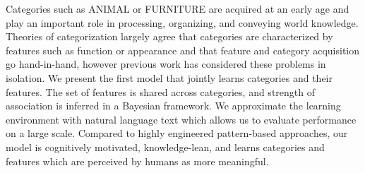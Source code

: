 Categories such as ANIMAL or FURNITURE are acquired at an early age and play an important role in processing, organizing, and conveying world knowledge. Theories of categorization largely agree that categories are characterized by features such as function or appearance and that feature and category acquisition go hand-in-hand, however previous work has considered these problems in isolation. We present the first model that jointly learns categories and their features. The set of features is shared across categories, and strength of association is inferred in a Bayesian framework. We approximate the learning environment with natural language text which allows us to evaluate performance on a large scale. Compared to highly engineered pattern-based approaches, our model is cognitively motivated, knowledge-lean, and learns categories and features which are perceived by humans as more meaningful.
